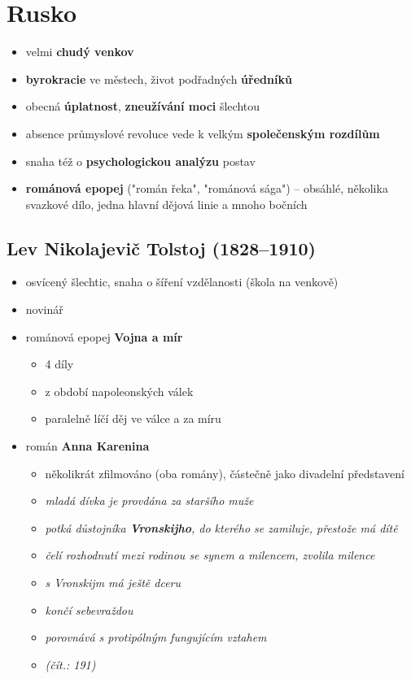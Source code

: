 \section{Rusko}
\begin{itemize}
\item velmi \textbf{chudý venkov}
\item \textbf{byrokracie} ve městech, život podřadných \textbf{úředníků}
\item obecná \textbf{úplatnost}, \textbf{zneužívání moci} šlechtou
\item absence průmyslové revoluce vede k velkým \textbf{společenským rozdílům}
\item snaha též o \textbf{psychologickou analýzu} postav
\item \textbf{románová epopej} ("román řeka", "románová sága") -- obsáhlé, několika svazkové dílo, jedna hlavní dějová linie a mnoho bočních
\end{itemize}

\subsection{Lev Nikolajevič Tolstoj (1828--1910)}
\begin{itemize}
\item osvícený šlechtic, snaha o šíření vzdělanosti (škola na venkově)
\item novinář
\item románová epopej \textbf{Vojna a mír}
	\begin{itemize}
	\item 4 díly
	\item z období napoleonských válek
	\item paralelně líčí děj ve válce a za míru
	\end{itemize}
\item román \textbf{Anna Karenina}
	\begin{itemize}
	\item několikrát zfilmováno (oba romány), částečně jako divadelní představení
	\item \textit{mladá dívka je provdána za staršího muže}
	\item \textit{potká důstojníka \textbf{Vronskijho}, do kterého se zamiluje, přestože má dítě}
	\item \textit{čelí rozhodnutí mezi rodinou se synem a milencem, zvolila milence}
	\item \textit{s Vronskijm má ještě dceru}
	\item \textit{končí sebevraždou}
	\item \textit{porovnává s protipólným fungujícím vztahem}
	\item \textit{(čít.: 191)}
	\end{itemize}
\end{itemize}

